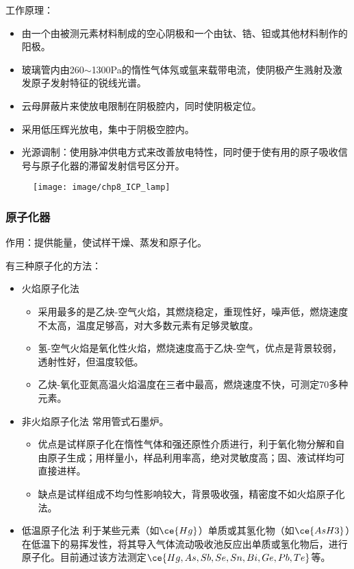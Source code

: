 工作原理：
\begin{itemize}
	\item 由一个由被测元素材料制成的空心阴极和一个由钛、锆、钽或其他材料制作的阳极。
	\item 玻璃管内由260$\sim$1300Pa的惰性气体氖或氩来载带电流，使阴极产生溅射及激发原子发射特征的锐线光谱。
	\item 云母屏蔽片来使放电限制在阴极腔内，同时使阴极定位。
	\item 采用低压辉光放电，集中于阴极空腔内。
	\item 光源调制：使用脉冲供电方式来改善放电特性，同时便于使有用的原子吸收信号与原子化器的滞留发射信号区分开。
\end{itemize}

\begin{figure}[!h]
	\centering
	\texttt{[image: image/chp8\_ICP\_lamp]}
	\caption{}
	\label{fig:chp8icplamp}
\end{figure}

\subsubsection{原子化器}
作用：提供能量，使试样干燥、蒸发和原子化。

有三种原子化的方法：

\begin{itemize}
	\item 火焰原子化法
	\begin{itemize}
		\item 采用最多的是乙炔-空气火焰，其燃烧稳定，重现性好，噪声低，燃烧速度不太高，温度足够高，对大多数元素有足够灵敏度。
		\item 氢-空气火焰是氧化性火焰，燃烧速度高于乙炔-空气，优点是背景较弱，透射性好，但温度较低。
		\item 乙炔-氧化亚氮高温火焰温度在三者中最高，燃烧速度不快，可测定70多种元素。
	\end{itemize}
	\item 非火焰原子化法
	常用管式石墨炉。
	\begin{itemize}
		\item 优点是试样原子化在惰性气体和强还原性介质进行，利于氧化物分解和自由原子生成；用样量小，样品利用率高，绝对灵敏度高；固、液试样均可直接进样。
		\item 缺点是试样组成不均匀性影响较大，背景吸收强，精密度不如火焰原子化法。
	\end{itemize}
	\item 低温原子化法
		利于某些元素（如$\ce{Hg}$）单质或其氢化物（如$\ce{AsH3}$）在低温下的易挥发性，将其导入气体流动吸收池反应出单质或氢化物后，进行原子化。目前通过该方法测定$\ce{Hg, As, Sb, Se, Sn, Bi, Ge, Pb, Te}$等。
\end{itemize}

